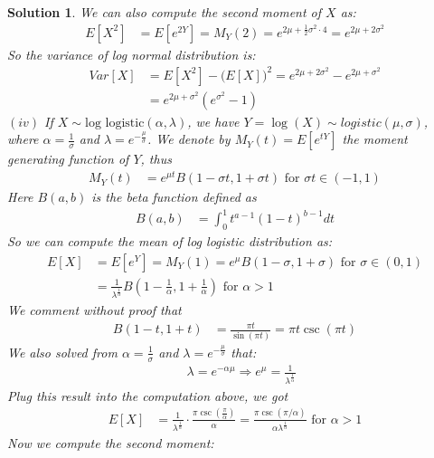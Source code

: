 \documentclass[11pt]{article}
\newtheorem{sol}{Solution}
\begin{document}
\begin{sol}
	We can also compute the second moment of $X$ as:
	\begin{align*}
		E[X^2] &= E[e^{2Y}] = M_Y(2) = e^{2\mu + \frac{1}{2}\sigma^2\cdot 4} = e^{2\mu + 2\sigma^2}
	\end{align*}
	So the variance of log normal distribution is:
	\begin{align*}
		Var[X] &= E[X^2] - \Big(E[X]\Big)^2 = e^{2\mu + 2\sigma^2} - e^{2\mu + \sigma^2}\\
		&= e^{2\mu + \sigma^2}(e^{\sigma^2} - 1)
	\end{align*}
	$(iv)$ If $X \sim \text{log logistic}(\alpha, \lambda)$, we have $Y = \log(X) \sim logistic(\mu, \sigma)$, where $\alpha = \frac{1}{\sigma}$ and $\lambda = e^{-\frac{\mu}{\sigma}}$.\vskip 2mm
	We denote by $M_Y(t) = E[e^{tY}]$ the moment generating function of $Y$, thus
	\begin{align*}
		M_Y(t) &= e^{\mu t}B(1 - \sigma t, 1 + \sigma t) \text{ for } \sigma t \in (-1, 1)
	\end{align*}
	Here $B(a, b)$ is the beta function defined as
	\begin{align*}
		B(a, b) &= \int_0^1 t^{a - 1}(1 - t)^{b - 1}d t
	\end{align*}
	So we can compute the mean of log logistic distribution as:
	\begin{align*}
		E[X] &= E[e^Y] = M_Y(1) = e^{\mu}B(1 - \sigma, 1 + \sigma) \text{ for } \sigma \in (0, 1)\\
		&= \frac{1}{\lambda^{\frac{1}{\alpha}}}B(1 - \frac{1}{\alpha}, 1 + \frac{1}{\alpha}) \text{ for } \alpha > 1
	\end{align*}
	We comment without proof that
	\begin{align*}
		B(1 - t, 1 + t) &= \frac{\pi t}{\sin(\pi t)} = \pi t \csc(\pi t)
	\end{align*}
	We also solved from $\alpha = \frac{1}{\sigma}$ and $\lambda = e^{-\frac{\mu}{\sigma}}$ that:
	\begin{align*}
		&\ \lambda = e^{-\alpha\mu} \Longrightarrow e^{\mu} = \frac{1}{\lambda^{\frac{1}{\alpha}}}
	\end{align*}
	Plug this result into the computation above, we got
	\begin{align*}
		E[X] &= \frac{1}{\lambda^{\frac{1}{\alpha}}}\cdot \frac{\pi \csc(\frac{\pi}{\alpha})}{\alpha} = \frac{\pi\csc(\pi/\alpha)}{\alpha\lambda^{\frac{1}{\alpha}}} \text{ for }\alpha > 1
	\end{align*}
	Now we compute the second moment:
	\begin{align*}

\end{align*}
\end{sol}
\end{document}
